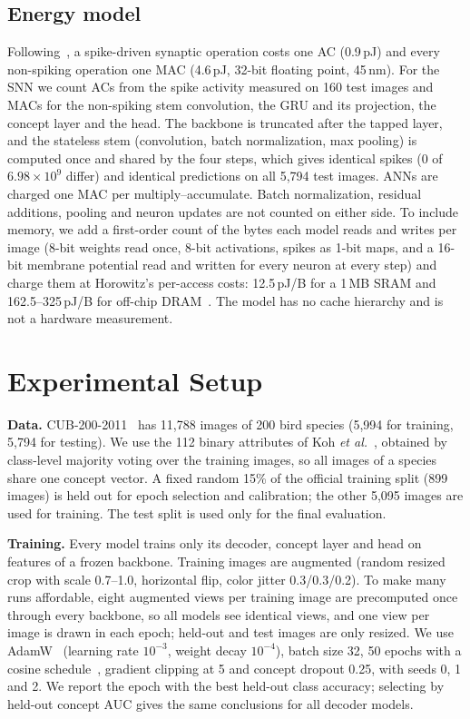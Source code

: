 \documentclass[conference]{IEEEtran}
\begin{document}
\subsection{Energy model}\label{sec:energy-model}
Following~\cite{horowitz2014computing,shi2024spikingresformer}, a spike-driven synaptic operation costs one AC (0.9\,pJ) and every non-spiking operation one MAC (4.6\,pJ, 32-bit floating point, 45\,nm). For the SNN we count ACs from the spike activity measured on 160 test images and MACs for the non-spiking stem convolution, the GRU and its projection, the concept layer and the head. The backbone is truncated after the tapped layer, and the stateless stem (convolution, batch normalization, max pooling) is computed once and shared by the four steps, which gives identical spikes (0 of $6.98\times10^9$ differ) and identical predictions on all 5,794 test images. ANNs are charged one MAC per multiply--accumulate. Batch normalization, residual additions, pooling and neuron updates are not counted on either side. To include memory, we add a first-order count of the bytes each model reads and writes per image (8-bit weights read once, 8-bit activations, spikes as 1-bit maps, and a 16-bit membrane potential read and written for every neuron at every step) and charge them at Horowitz's per-access costs: 12.5\,pJ/B for a 1\,MB SRAM and 162.5--325\,pJ/B for off-chip DRAM~\cite{horowitz2014computing}. The model has no cache hierarchy and is not a hardware measurement.

\section{Experimental Setup}\label{sec:setup}

\textbf{Data.} CUB-200-2011~\cite{wah2011cub} has 11,788 images of 200 bird species (5,994 for training, 5,794 for testing). We use the 112 binary attributes of Koh \emph{et al.}~\cite{koh2020concept}, obtained by class-level majority voting over the training images, so all images of a species share one concept vector. A fixed random 15\% of the official training split (899 images) is held out for epoch selection and calibration; the other 5,095 images are used for training. The test split is used only for the final evaluation.

\textbf{Training.} Every model trains only its decoder, concept layer and head on features of a frozen backbone. Training images are augmented (random resized crop with scale 0.7--1.0, horizontal flip, color jitter 0.3/0.3/0.2). To make many runs affordable, eight augmented views per training image are precomputed once through every backbone, so all models see identical views, and one view per image is drawn in each epoch; held-out and test images are only resized. We use AdamW~\cite{loshchilov2019decoupled} (learning rate $10^{-3}$, weight decay $10^{-4}$), batch size 32, 50 epochs with a cosine schedule~\cite{loshchilov2017sgdr}, gradient clipping at 5 and concept dropout 0.25, with seeds 0, 1 and 2. We report the epoch with the best held-out class accuracy; selecting by held-out concept AUC gives the same conclusions for all decoder models.
\end{document}
